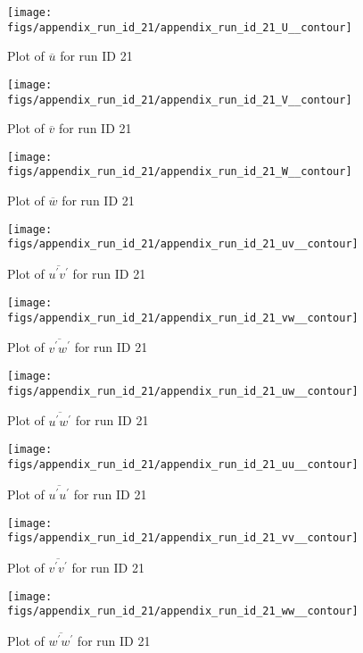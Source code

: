 \begin{figure}[H]
\centering
\texttt{[image: figs/appendix\_run\_id\_21/appendix\_run\_id\_21\_U\_\_contour]}
\caption{Plot of $\overline{u}$ for run ID 21}
\label{fig:appendix_run_id_21_U__contour}
\end{figure}


\begin{figure}[H]
\centering
\texttt{[image: figs/appendix\_run\_id\_21/appendix\_run\_id\_21\_V\_\_contour]}
\caption{Plot of $\overline{v}$ for run ID 21}
\label{fig:appendix_run_id_21_V__contour}
\end{figure}


\begin{figure}[H]
\centering
\texttt{[image: figs/appendix\_run\_id\_21/appendix\_run\_id\_21\_W\_\_contour]}
\caption{Plot of $\overline{w}$ for run ID 21}
\label{fig:appendix_run_id_21_W__contour}
\end{figure}


\begin{figure}[H]
\centering
\texttt{[image: figs/appendix\_run\_id\_21/appendix\_run\_id\_21\_uv\_\_contour]}
\caption{Plot of $\overline{u^\prime v^\prime}$ for run ID 21}
\label{fig:appendix_run_id_21_uv__contour}
\end{figure}


\begin{figure}[H]
\centering
\texttt{[image: figs/appendix\_run\_id\_21/appendix\_run\_id\_21\_vw\_\_contour]}
\caption{Plot of $\overline{v^\prime w^\prime}$ for run ID 21}
\label{fig:appendix_run_id_21_vw__contour}
\end{figure}


\begin{figure}[H]
\centering
\texttt{[image: figs/appendix\_run\_id\_21/appendix\_run\_id\_21\_uw\_\_contour]}
\caption{Plot of $\overline{u^\prime w^\prime}$ for run ID 21}
\label{fig:appendix_run_id_21_uw__contour}
\end{figure}


\begin{figure}[H]
\centering
\texttt{[image: figs/appendix\_run\_id\_21/appendix\_run\_id\_21\_uu\_\_contour]}
\caption{Plot of $\overline{u^\prime u^\prime}$ for run ID 21}
\label{fig:appendix_run_id_21_uu__contour}
\end{figure}


\begin{figure}[H]
\centering
\texttt{[image: figs/appendix\_run\_id\_21/appendix\_run\_id\_21\_vv\_\_contour]}
\caption{Plot of $\overline{v^\prime v^\prime}$ for run ID 21}
\label{fig:appendix_run_id_21_vv__contour}
\end{figure}


\begin{figure}[H]
\centering
\texttt{[image: figs/appendix\_run\_id\_21/appendix\_run\_id\_21\_ww\_\_contour]}
\caption{Plot of $\overline{w^\prime w^\prime}$ for run ID 21}
\label{fig:appendix_run_id_21_ww__contour}
\end{figure}


